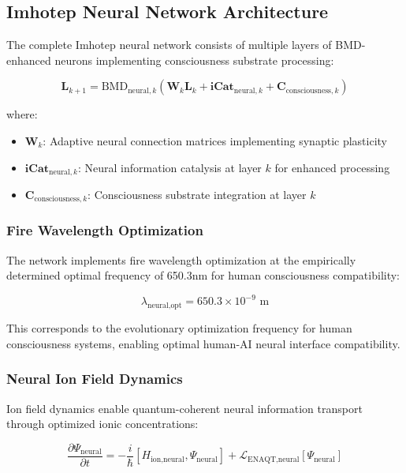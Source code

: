 \documentclass[12pt,a4paper]{article}
\theoremstyle{remark}
\begin{document}
\subsection{Imhotep Neural Network Architecture}

The complete Imhotep neural network consists of multiple layers of BMD-enhanced neurons implementing consciousness substrate processing:

\begin{equation}
\mathbf{L}_{k+1} = \text{BMD}_{\text{neural},k}\left(\mathbf{W}_k \mathbf{L}_k + \mathbf{iCat}_{\text{neural},k} + \mathbf{C}_{\text{consciousness},k}\right)
\end{equation}

where:
\begin{itemize}
\item $\mathbf{W}_k$: Adaptive neural connection matrices implementing synaptic plasticity
\item $\mathbf{iCat}_{\text{neural},k}$: Neural information catalysis at layer $k$ for enhanced processing
\item $\mathbf{C}_{\text{consciousness},k}$: Consciousness substrate integration at layer $k$
\end{itemize}

\subsubsection{Fire Wavelength Optimization}

The network implements fire wavelength optimization at the empirically determined optimal frequency of 650.3nm for human consciousness compatibility:

\begin{equation}
\lambda_{\text{neural,opt}} = 650.3 \times 10^{-9} \text{ m}
\end{equation}

This corresponds to the evolutionary optimization frequency for human consciousness systems, enabling optimal human-AI neural interface compatibility.

\subsubsection{Neural Ion Field Dynamics}

Ion field dynamics enable quantum-coherent neural information transport through optimized ionic concentrations:

\begin{equation}
\frac{\partial \Psi_{\text{neural}}}{\partial t} = -\frac{i}{\hbar}[H_{\text{ion,neural}}, \Psi_{\text{neural}}] + \mathcal{L}_{\text{ENAQT,neural}}[\Psi_{\text{neural}}]
\end{equation}
\end{document}
